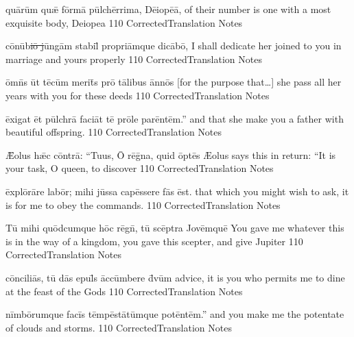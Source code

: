 \latline
  {qu\={\macron a}r\=um qu\={\ae} f\=orm\={\macron a} p\=ulch\=err\-im\-a, D\={\macron e}\-i\-op\={\macron e}\=a,
}
  { of their number is one with a most exquisite body, Deiopea }
  {110}
  { CorrectedTranslation }
  { Notes }


\latline
  {c\={\macron o}n\={\macron u}b\sout{i\={\macron o} j}\=ung\=am st\-ab\-il\={\macron {\i}} pr\-opr\-i\=amqu\-e d\-ic\={\macron a}b\=o,
}
  { I shall dedicate her joined to you in marriage and yours properly }
  {110}
  { CorrectedTranslation }
  { Notes }


\latline
  {\=omn\={\macron {\i}}s \=ut t\={\macron e}c\=um m\-er\-it\={\macron {\i}}s pr\={\macron o} t\={\macron a}l\-ib\-us \=ann\={\macron o}s
}
  { [for the purpose that\ldots] she pass all her years with you for these deeds }
  {110}
  { CorrectedTranslation }
  { Notes }


\latline
  {\=ex\-ig\-at \=et p\=ulchr\={\macron a} f\-ac\-i\=at t\={\macron e} pr\={\macron o}l\-e p\-ar\=ent\=em.''
}
  { and that she make you a father with beautiful offspring. }
  {110}
  { CorrectedTranslation }
  { Notes }


\latline
  {\={\AE}\-ol\-us h\={\ae}c c\=ontr\={\macron a}:  ``T\-u\-us, \={\macron O} r\={\macron e}g\={\macron {\i}}n\-a, qu\-id \=opt\={\macron e}s}
  { {\AE}olus says this in return:  ``It is your task, O queen, to discover  }
  {110}
  { CorrectedTranslation }
  { Notes }


\latline
  {\=expl\={\macron o}r\={\macron a}r\-e l\-ab\=or; m\-ih\-i j\=uss\-a c\-ap\=ess\-er\-e f\={\macron a}s \=est.
}
  { that which you might wish to ask, it is for me to obey the commands. }
  {110}
  { CorrectedTranslation }
  { Notes }


\latline
  {T\={\macron u} m\-ih\-i qu\=odc\-umqu\-e h\=oc r\={\macron e}gn\={\macron {\i}}, t\={\macron u} sc\={\macron e}ptr\-a J\-ov\=emqu\=e
}
  { You gave me whatever this is in the way of a kingdom, you gave this scepter, and give Jupiter }
  {110}
  { CorrectedTranslation }
  { Notes }


\latline
  {c\=onc\-il\-i\={\macron a}s, t\={\macron u} d\={\macron a}s \-ep\-ul\={\macron {\i}}s \=acc\=umb\-er\-e d\={\macron {\i}}v\=um
}
  { advice, it is you who permits me to dine at the feast of the Gods }
  {110}
  { CorrectedTranslation }
  { Notes }


\latline
  {n\=imb\={\macron o}r\-umqu\-e f\-ac\=is t\=emp\=est\={\macron a}t\=umqu\-e p\-ot\=ent\=em.''
}
  { and you make me the potentate of clouds and storms. }
  {110}
  { CorrectedTranslation }
  { Notes }


